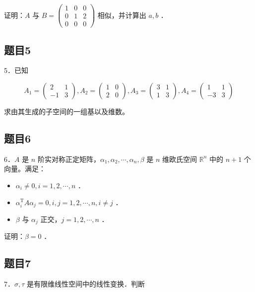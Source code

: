 \documentclass{article}
\begin{document}
证明：\(A\) 与 \(B=\left(\begin{array}{lll}1 & 0 & 0 \\ 0 & 1 & 2 \\ 0 & 0 & 0\end{array}\right)\) 相似，并计算出 \(a, b\) ．

\subsection{题目5}
5．已知

\[
A_{1}=\left(\begin{array}{cc}
2 & 1 \\
-1 & 3
\end{array}\right), A_{2}=\left(\begin{array}{ll}
1 & 0 \\
2 & 0
\end{array}\right), A_{3}=\left(\begin{array}{ll}
3 & 1 \\
1 & 3
\end{array}\right), A_{4}=\left(\begin{array}{cc}
1 & 1 \\
-3 & 3
\end{array}\right)
\]

求由其生成的子空间的一组基以及维数。

\subsection{题目6}
6．\(A\) 是 \(n\) 阶实对称正定矩阵，\(\alpha_{1}, \alpha_{2}, \cdots, \alpha_{n}, \beta\) 是 \(n\) 维欧氏空间 \(\mathbb{R}^{n}\) 中的 \(n+1\) 个向量。满足：

\begin{itemize}
  \item[（1）] \(\alpha_{i} \neq 0, i=1,2, \cdots, n\) ．
  \item[（2）] \(\alpha_{i}^{\mathrm{T}} A \alpha_{j}=0, i, j=1,2, \cdots, n, i \neq j\) ．
  \item[（3）] \(\beta\) 与 \(\alpha_{j}\) 正交，\(j=1,2, \cdots, n\) ．
\end{itemize}

证明：\(\beta=0\) ．

\subsection{题目7}
7．\(\sigma, \tau\) 是有限维线性空间中的线性变换．判断
\end{document}
